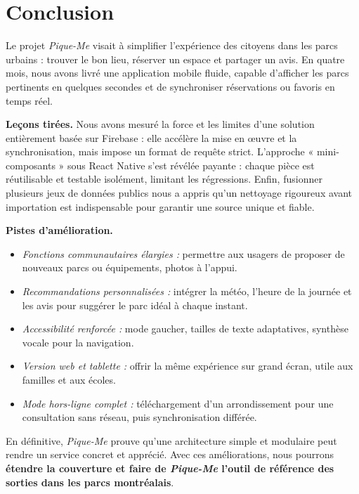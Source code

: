 \documentclass[12pt,a4paper]{article}
\begin{document}
\medskip\noindent


\section{Conclusion}

Le projet \textit{Pique-Me} visait à simplifier l'expérience des citoyens dans les parcs urbains : trouver le bon lieu, réserver un espace et partager un avis. En quatre mois, nous avons livré une application mobile fluide, capable d'afficher les parcs pertinents en quelques secondes et de synchroniser réservations ou favoris en temps réel. 

\medskip\noindent
\textbf{Leçons tirées.}  
Nous avons mesuré la force et les limites d'une solution entièrement basée sur Firebase : elle accélère la mise en œuvre et la synchronisation, mais impose un format de requête strict. L'approche « mini-composants » sous React Native s'est révélée payante : chaque pièce est réutilisable et testable isolément, limitant les régressions. Enfin, fusionner plusieurs jeux de données publics nous a appris qu'un nettoyage rigoureux avant importation est indispensable pour garantir une source unique et fiable.

\medskip\noindent
\textbf{Pistes d'amélioration.}  
\begin{itemize}
  \item \emph{Fonctions communautaires élargies :} permettre aux usagers de proposer de nouveaux parcs ou équipements, photos à l'appui.
  \item \emph{Recommandations personnalisées :} intégrer la météo, l'heure de la journée et les avis pour suggérer le parc idéal à chaque instant.
  \item \emph{Accessibilité renforcée :} mode gaucher, tailles de texte adaptatives, synthèse vocale pour la navigation.
  \item \emph{Version web et tablette :} offrir la même expérience sur grand écran, utile aux familles et aux écoles.
  \item \emph{Mode hors-ligne complet :} téléchargement d'un arrondissement pour une consultation sans réseau, puis synchronisation différée.
\end{itemize}

\medskip\noindent
En définitive, \textit{Pique-Me} prouve qu'une architecture simple et modulaire peut rendre un service concret et apprécié. Avec ces améliorations, nous pourrons \textbf{étendre la couverture et faire de \textit{Pique-Me} l'outil de référence des sorties dans les parcs montréalais}.
\end{document}
